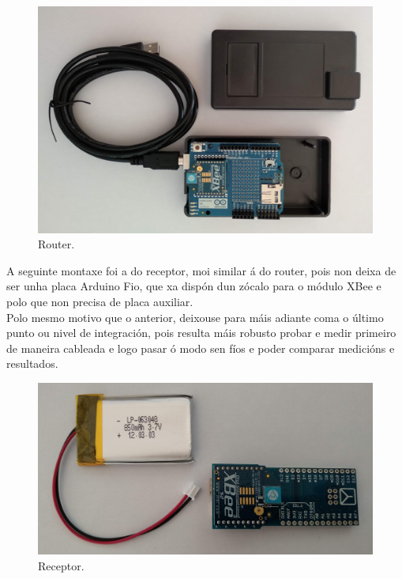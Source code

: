    \begin{figure}[htbp]
    \centering
    \includegraphics[scale=0.15,keepaspectratio=true]{./imagenes/router.jpg}
    \caption{Router.}
    \label{figura:Router}
   \end{figure}
   
   A seguinte montaxe foi a do receptor, moi similar á do router, pois non deixa
   de ser unha placa Arduino Fio, que xa dispón dun zócalo para o módulo XBee e
   polo que non precisa de placa auxiliar. \\
   
   Polo mesmo motivo que o anterior, deixouse para máis adiante coma o último
   punto ou nivel de integración, pois resulta máis robusto probar e medir
   primeiro de maneira cableada e logo pasar ó modo sen fíos e poder comparar
   medicións e resultados. \\
  
   \begin{figure}[htbp]
    \centering
    \includegraphics[scale=0.15,keepaspectratio=true]{./imagenes/receptor.jpg}
    \caption{Receptor.}
    \label{figura:Receptor}
   \end{figure}
   
